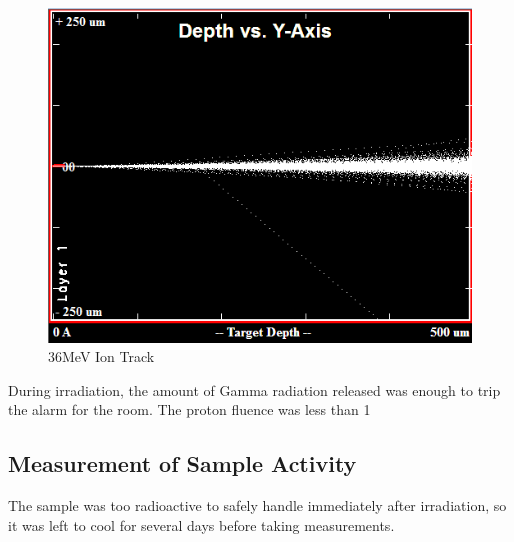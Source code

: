 \begin{figure}[htp]
  \begin{center}
    \includegraphics[scale=0.55]{chapters/methodology_activity/images/ion_transport.png}
    \caption{36MeV Ion Track}
    \label{graph:graph1}
  \end{center}
\end{figure}

During irradiation, the amount of Gamma radiation released was enough to trip the alarm for the room.  The proton fluence was less than 1%


\subsection{Measurement of Sample Activity}

The sample was too radioactive to safely handle immediately after irradiation, so it was left to cool for several days before taking measurements.










